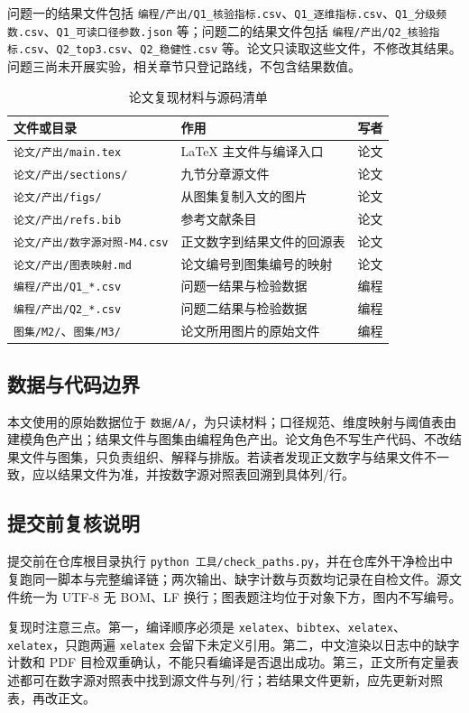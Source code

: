 问题一的结果文件包括 \texttt{编程/产出/Q1\_核验指标.csv}、\texttt{Q1\_逐维指标.csv}、\texttt{Q1\_分级频数.csv}、\texttt{Q1\_可读口径参数.json} 等；问题二的结果文件包括 \texttt{编程/产出/Q2\_核验指标.csv}、\texttt{Q2\_top3.csv}、\texttt{Q2\_稳健性.csv} 等。论文只读取这些文件，不修改其结果。问题三尚未开展实验，相关章节只登记路线，不包含结果数值。

\begin{table}[H]
\centering
{}
\begin{tabularx}{\textwidth}{@{}p{}p{}X@{}}
\toprule
文件或目录 & 作用 & 写者 \\
\midrule
\texttt{论文/产出/main.tex} & LaTeX 主文件与编译入口 & 论文 \\
\texttt{论文/产出/sections/} & 九节分章源文件 & 论文 \\
\texttt{论文/产出/figs/} & 从图集复制入文的图片 & 论文 \\
\texttt{论文/产出/refs.bib} & 参考文献条目 & 论文 \\
\texttt{论文/产出/数字源对照-M4.csv} & 正文数字到结果文件的回源表 & 论文 \\
\texttt{论文/产出/图表映射.md} & 论文编号到图集编号的映射 & 论文 \\
\texttt{编程/产出/Q1\_*.csv} & 问题一结果与检验数据 & 编程 \\
\texttt{编程/产出/Q2\_*.csv} & 问题二结果与检验数据 & 编程 \\
\texttt{图集/M2/}、\texttt{图集/M3/} & 论文所用图片的原始文件 & 编程 \\
\bottomrule
\end{tabularx}
\caption{论文复现材料与源码清单}
\label{tab:repro}
\end{table}

\subsection{数据与代码边界}

本文使用的原始数据位于 \texttt{数据/A/}，为只读材料；口径规范、维度映射与阈值表由建模角色产出；结果文件与图集由编程角色产出。论文角色不写生产代码、不改结果文件与图集，只负责组织、解释与排版。若读者发现正文数字与结果文件不一致，应以结果文件为准，并按数字源对照表回溯到具体列/行。

\subsection{提交前复核说明}

提交前在仓库根目录执行 \texttt{python 工具/check\_paths.py}，并在仓库外干净检出中复跑同一脚本与完整编译链；两次输出、缺字计数与页数均记录在自检文件。源文件统一为 UTF-8 无 BOM、LF 换行；图表题注均位于对象下方，图内不写编号。

复现时注意三点。第一，编译顺序必须是 \texttt{xelatex}、\texttt{bibtex}、\texttt{xelatex}、\texttt{xelatex}，只跑两遍 \texttt{xelatex} 会留下未定义引用。第二，中文渲染以日志中的缺字计数和 PDF 目检双重确认，不能只看编译是否退出成功。第三，正文所有定量表述都可在数字源对照表中找到源文件与列/行；若结果文件更新，应先更新对照表，再改正文。
